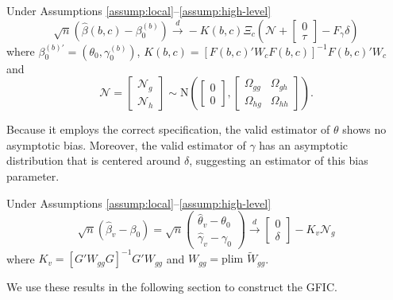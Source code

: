 \begin{thm}
\label{thm:asymp}
Under Assumptions \ref{assump:local}--\ref{assump:high-level}
		\begin{equation}
		\sqrt{n}\left(\widehat{\beta}(b,c) - \beta_0^{(b)}\right) \overset{d}{\rightarrow} - K(b,c)\Xi_c \left(\mathscr{N}+ \left[ \begin{array}{c} 0\\ \tau\end{array}\right] - F_\gamma\delta\right)
	\end{equation}
where $\beta_0^{(b)'} = (\theta_0, \gamma_0^{(b)})$, $K(b,c) = \left[F(b,c)'W_c F(b,c)\right]^{-1} F(b,c)' W_c$
and
	\begin{equation}
		\mathscr{N} = \left[\begin{array}{c} \mathscr{N}_g\\  \mathscr{N}_h\end{array}\right]\sim \mbox{N}\left(\left[\begin{array}{c} 0\\ 0\end{array}\right] , \left[ \begin{array}{cc}\Omega_{gg} & \Omega_{gh}\\ \Omega_{hg}& \Omega_{hh} \end{array} \right]\right).
	\end{equation}
\end{thm}	
Because it employs the correct specification, the valid estimator of $\theta$ shows no asymptotic bias.
Moreover, the valid estimator of $\gamma$ has an asymptotic distribution that is centered around $\delta$, suggesting an estimator of this bias parameter.
\begin{cor}
\label{cor:valid}
Under Assumptions \ref{assump:local}--\ref{assump:high-level}
		$$\sqrt{n}\left( \widehat{\beta}_v - \beta_0 \right) = \sqrt{n}\left(\begin{array}{c} \widehat{\theta}_v - \theta_0\\ \widehat{\gamma}_v - \gamma_0\end{array} \right) \overset{d}{\rightarrow}  \left[\begin{array}{c} 0\\ \delta\end{array}\right] -K_v \mathscr{N}_g$$
where $K_v = \left[G'W_{gg}G\right]^{-1}G'W_{gg}$ and $W_{gg} = \mbox{plim }\widetilde{W}_{gg}$.
\end{cor}
We use these results in the following section to construct the GFIC.

